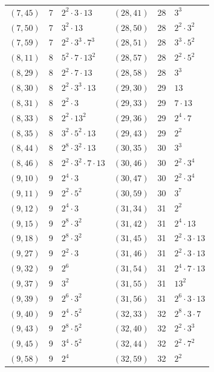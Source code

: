 \documentclass[11pt]{article}
\begin{document}
\begin{longtable}{@{}lrl@{\qquad}lrl@{}}
$(7,45)$ & 7 & $2^{2}\cdot 3\cdot 13$ & $(28,41)$ & 28 & $3^{3}$\\
$(7,50)$ & 7 & $3^{2}\cdot 13$ & $(28,50)$ & 28 & $2^{2}\cdot 3^{2}$\\
$(7,59)$ & 7 & $2^{2}\cdot 3^{3}\cdot 7^{3}$ & $(28,51)$ & 28 & $3^{3}\cdot 5^{2}$\\
$(8,11)$ & 8 & $5^{2}\cdot 7\cdot 13^{2}$ & $(28,57)$ & 28 & $2^{2}\cdot 5^{2}$\\
$(8,29)$ & 8 & $2^{2}\cdot 7\cdot 13$ & $(28,58)$ & 28 & $3^{3}$\\
$(8,30)$ & 8 & $2^{2}\cdot 3^{3}\cdot 13$ & $(29,30)$ & 29 & $13$\\
$(8,31)$ & 8 & $2^{2}\cdot 3$ & $(29,33)$ & 29 & $7\cdot 13$\\
$(8,33)$ & 8 & $2^{2}\cdot 13^{2}$ & $(29,36)$ & 29 & $2^{4}\cdot 7$\\
$(8,35)$ & 8 & $3^{2}\cdot 5^{2}\cdot 13$ & $(29,43)$ & 29 & $2^{2}$\\
$(8,44)$ & 8 & $2^{8}\cdot 3^{2}\cdot 13$ & $(30,35)$ & 30 & $3^{3}$\\
$(8,46)$ & 8 & $2^{2}\cdot 3^{2}\cdot 7\cdot 13$ & $(30,46)$ & 30 & $2^{2}\cdot 3^{4}$\\
$(9,10)$ & 9 & $2^{4}\cdot 3$ & $(30,47)$ & 30 & $2^{2}\cdot 3^{4}$\\
$(9,11)$ & 9 & $2^{2}\cdot 5^{2}$ & $(30,59)$ & 30 & $3^{7}$\\
$(9,12)$ & 9 & $2^{4}\cdot 3$ & $(31,34)$ & 31 & $2^{2}$\\
$(9,15)$ & 9 & $2^{8}\cdot 3^{2}$ & $(31,42)$ & 31 & $2^{4}\cdot 13$\\
$(9,18)$ & 9 & $2^{8}\cdot 3^{2}$ & $(31,45)$ & 31 & $2^{2}\cdot 3\cdot 13$\\
$(9,27)$ & 9 & $2^{2}\cdot 3$ & $(31,46)$ & 31 & $2^{2}\cdot 3\cdot 13$\\
$(9,32)$ & 9 & $2^{6}$ & $(31,54)$ & 31 & $2^{4}\cdot 7\cdot 13$\\
$(9,37)$ & 9 & $3^{2}$ & $(31,55)$ & 31 & $13^{2}$\\
$(9,39)$ & 9 & $2^{6}\cdot 3^{2}$ & $(31,56)$ & 31 & $2^{6}\cdot 3\cdot 13$\\
$(9,40)$ & 9 & $2^{4}\cdot 5^{2}$ & $(32,33)$ & 32 & $2^{8}\cdot 3\cdot 7$\\
$(9,43)$ & 9 & $2^{8}\cdot 5^{2}$ & $(32,40)$ & 32 & $2^{2}\cdot 3^{3}$\\
$(9,45)$ & 9 & $3^{4}\cdot 5^{2}$ & $(32,44)$ & 32 & $2^{2}\cdot 7^{2}$\\
$(9,58)$ & 9 & $2^{4}$ & $(32,59)$ & 32 & $2^{2}$\\

\end{longtable}
\end{document}
